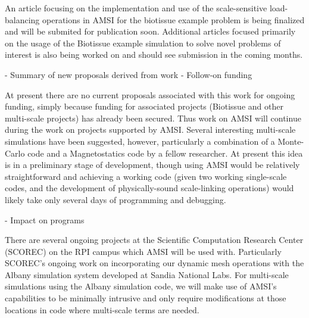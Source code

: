 An article focusing on the implementation and use of the scale-sensitive load-balancing operations in AMSI for the biotissue example problem is being finalized and will be submited for publication soon. Additional articles focused primarily on the usage of the Biotissue example simulation to solve novel problems of interest is also being worked on and should see submission in the coming months.

- Summary of new proposals derived from work
- Follow-on funding

At present there are no current proposals associated with this work for ongoing funding, simply because funding for associated projects (Biotissue and other multi-scale projects) has already been secured. Thus work on AMSI will continue during the work on projects supported by AMSI. Several interesting multi-scale simulations have been suggested, however, particularly a combination of a Monte-Carlo code and a Magnetostatics code by a fellow researcher. At present this idea is in a preliminary stage of development, though using AMSI would be relatively straightforward and achieving a working code (given two working single-scale codes, and the development of physically-sound scale-linking operations) would likely take only several days of programming and debugging.

- Impact on programs

There are several ongoing projects at the Scientific Computation Research Center (SCOREC) on the RPI campus which AMSI will be used with. Particularly SCOREC's ongoing work on incorporating our dynamic mesh operations with the Albany simulation system developed at Sandia National Labs. For multi-scale simulations using the Albany simulation code, we will make use of AMSI's capabilities to be minimally intrusive and only require modifications at those locations in code where multi-scale terms are needed.